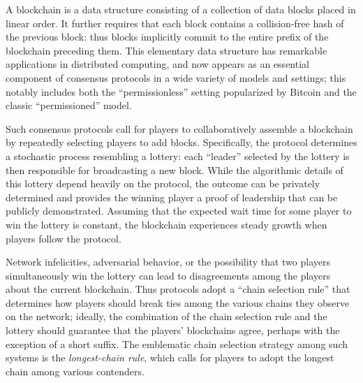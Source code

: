 
A blockchain is a data structure consisting of a collection of data
blocks placed in linear order. It further requires that
each block contains a collision-free hash of the previous block: thus
blocks implicitly commit to the entire prefix of the blockchain
preceding them. This elementary data structure has remarkable
applications in distributed computing, and now appears as an essential
component of consensus protocols in a wide variety of models and
settings; this notably includes both the ``permissionless'' setting
popularized by Bitcoin and the classic ``permissioned'' model.

Such consensus protocols call for players to collaboratively assemble
a blockchain by repeatedly selecting players to add blocks.
%
Specifically, the protocol determines a stochastic process resembling
a lottery: each ``leader'' selected by the lottery is then responsible
for broadcasting a new block. While the algorithmic details of this
lottery depend heavily on the protocol, the outcome can be privately
determined and provides the winning player a proof of leadership that
can be publicly demonstrated. Assuming that the expected wait time for
some player to win the lottery is constant, the blockchain experiences
steady growth when players follow the protocol.

Network infelicities, adversarial behavior, or the possibility that
two players simultaneously win the lottery can lead to disagreements
among the players about the current blockchain. Thus protocols adopt a
``chain selection rule'' that determines how players should break ties
among the various chains they observe on the network; ideally, the
combination of the chain selection rule and the lottery should
guarantee that the players' blockchains agree, perhaps with the
exception of a short suffix. The emblematic chain selection strategy
among such systems is the \emph{longest-chain rule}, which calls for
players to adopt the longest chain among various contenders.

%

